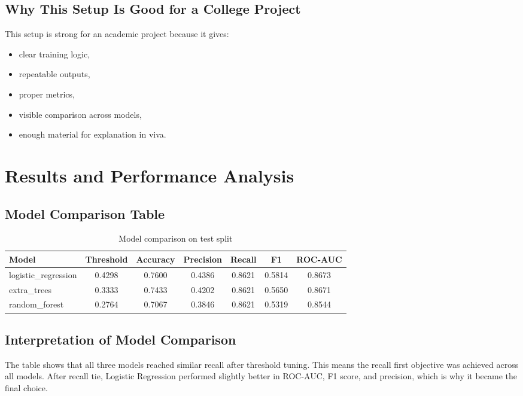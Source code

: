 \documentclass[12pt,a4paper,openany]{report}
\begin{document}
    \section{Why This Setup Is Good for a College Project}
    This setup is strong for an academic project because it gives:
    \begin{itemize}[leftmargin=1.4cm]
    \item clear training logic,
    \item repeatable outputs,
    \item proper metrics,
    \item visible comparison across models,
    \item enough material for explanation in viva.
    \end{itemize}

    \chapter{Results and Performance Analysis}
    \section{Model Comparison Table}
    \begin{table}[H]
    \centering
    \caption{Model comparison on test split}
    \begin{tabular}{lcccccc}
    \toprule
    \textbf{Model} & \textbf{Threshold} & \textbf{Accuracy} & \textbf{Precision} & \textbf{Recall} & \textbf{F1} & \textbf{ROC-AUC} \\
    \midrule
    logistic\_regression & 0.4298 & 0.7600 & 0.4386 & 0.8621 & 0.5814 & 0.8673 \\
    extra\_trees & 0.3333 & 0.7433 & 0.4202 & 0.8621 & 0.5650 & 0.8671 \\
    random\_forest & 0.2764 & 0.7067 & 0.3846 & 0.8621 & 0.5319 & 0.8544 \\
    \bottomrule
    \end{tabular}
    \end{table}

    \section{Interpretation of Model Comparison}
    The table shows that all three models reached similar recall after threshold tuning. This means the recall first objective was achieved across all models. After recall tie, Logistic Regression performed slightly better in ROC-AUC, F1 score, and precision, which is why it became the final choice.
\end{document}

